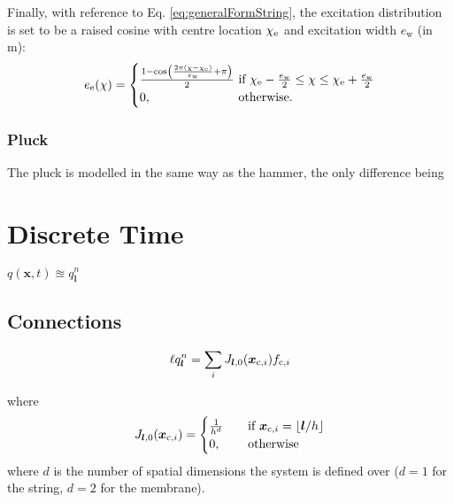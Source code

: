 \documentclass{article}
\begin{document}
Finally, with reference to Eq. \eqref{eq:generalFormString}, the excitation distribution is set to be a raised cosine with centre location $\chi_{\text{e}}$ and excitation width $e_\text{w}$ (in m):
\begin{equation}
    e_\etxt(\chi) = \begin{cases}
        \frac{1 - \cos\left(\frac{2\pi (\chi - \chi_\etxt)}{e_\text{w}} + \pi\right)}{2}&\!\!\!\!\text{if}\ \chi_\etxt - \frac{e_\text{w}}{2}\leq \chi \leq \chi_\etxt + \frac{e_\text{w}}{2}\\
        0,& \!\!\!\!\text{otherwise.}
        \end{cases}
\end{equation}
\subsubsection{Pluck}
The pluck is modelled in the same way as the hammer, the only difference being

\section{Discrete Time}

$q(\boldsymbol{x},t)\approxeq q_{\boldsymbol{l}}^n$
\subsection{Connections}\label{sec:discConnections}
\begin{equation}
    \ell q_{\boldsymbol{l}}^n = \sum_i J_{\boldsymbol{l},0}(\boldsymbol{x}_{\text{c},i})f_{\text{c}, i}
\end{equation}

where 
\begin{equation}
    J_{\boldsymbol{l},0}(\boldsymbol{x}_{\text{c}, i}) = \begin{cases}
    \frac{1}{h^d}&\quad \text{if}\ \boldsymbol{x}_{\ctxt, i} = \floor[\boldsymbol{l}/h]\\
    0, &\quad\text{otherwise}
    \end{cases}
\end{equation}
where $d$ is the number of spatial dimensions the system is defined over ($d = 1$ for the string, $d=2$ for the membrane). 
\end{document}

